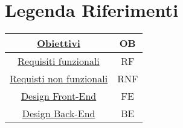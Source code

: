 \section{Legenda Riferimenti}
\label{secD1:LegendaRiferimenti}

\begin{tabular}{|c|c|}
    \hline
    \hyperref[secD1:ObiettiviDelProgetto]{Obiettivi} & OB \\
    \hline
    \hyperref[secD1:RequisitiFunzionali]{Requisiti funzionali} & RF\\
    \hline
    \hyperref[secD1:RequisitiNonFunzionali]{Requisti non funzionali} & RNF\\
    \hline
    \hyperref[secD1:RequisitiFrontEnd]{Design Front-End} & FE\\
    \hline
    \hyperref[secD1:RequisitiBackEnd]{Design Back-End} & BE\\
    \hline
\end{tabular}